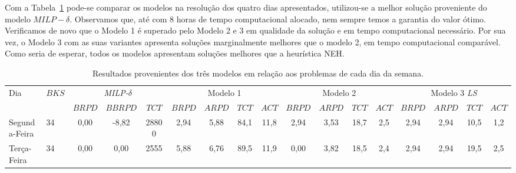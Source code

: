 Com a Tabela~\ref{tab:P2_dias} pode-se comparar os modelos na resolução dos quatro dias apresentados, utilizou-se a melhor solução proveniente do modelo $MILP-\delta$. Observamos que, até com 8 horas de tempo computacional alocado, nem sempre temos a garantia do valor ótimo.\\
Verificamos de novo que o Modelo 1 é superado pelo Modelo 2 e 3 em qualidade da solução e em tempo computacional necessário. Por sua vez, o Modelo 3 com as suas variantes apresenta soluções marginalmente melhores que o modelo 2, em tempo computacional comparável. Como seria de esperar, todos os modelos apresentam soluções melhores que a heurística NEH.\\
\begin{landscape}
\begin{table}[H]
\caption{Resultados provenientes dos três modelos em relação aos problemas de cada dia da semana.}
\label{tab:P2_dias}
\setlength{\tabcolsep}{2pt} %
\begin{tabular}{llccccccccccccccc}
\multirow{2}{*}{Dia} & \multicolumn{1}{l|}{\multirow{2}{*}{$BKS$}} & \multicolumn{3}{c|}{\textit{MILP-$\delta$}}                                & \multicolumn{4}{c|}{Modelo 1}                                                                & \multicolumn{4}{c|}{Modelo 2}                                                                         & \multicolumn{4}{c}{Modelo 3 \textit{LS}}                                       \\
                     & \multicolumn{1}{l|}{}                       & $BRPD$               & $BBRPD$              & \multicolumn{1}{c|}{$TCT$}   & $BRPD$                     & $ARPD$               & $TCT$                & \multicolumn{1}{c|}{$ACT$} & $BRPD$                     & $ARPD$               & $TCT$                & \multicolumn{1}{c|}{$ACT$} & $BRPD$                     & $ARPD$               & $TCT$                & $ACT$                \\ \hline
Segunda-Feira        & \multicolumn{1}{l|}{34}                     & 0,00                 & -8,82                & \multicolumn{1}{c|}{28800}   & 2,94                       & 5,88                 & 84,1                 & \multicolumn{1}{c|}{11,8}  & 2,94                       & 3,53                 & 18,7                 & \multicolumn{1}{c|}{2,5}   & 2,94                       & 2,94                 & 10,5                 & 1,2                  \\
Terça-Feira          & \multicolumn{1}{l|}{34}                     & 0,00                 & 0,00                 & \multicolumn{1}{c|}{2555}    & 5,88                       & 6,76                 & 89,5                 & \multicolumn{1}{c|}{11,9}  & 0,00                       & 3,82                 & 18,5                 & \multicolumn{1}{c|}{2,4}   & 2,94                       & 2,94                 & 19,5                 & 2,5                  \\

\end{tabular}
\end{table}
\end{landscape}
